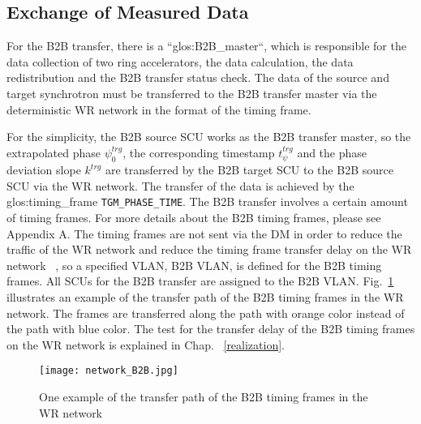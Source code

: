 \subsection{Exchange of Measured Data}

For the B2B transfer, there is a ``\gls{glos:B2B_master}``, which is responsible for the data collection of two ring accelerators, the data calculation, the data redistribution and the B2B transfer status check. The data of the source and target synchrotron must be transferred to the B2B transfer master via the deterministic WR network in the format of the timing frame.
 
For the simplicity, the B2B source SCU works as the B2B transfer master, so the extrapolated phase $\psi^\mathit{trg}_0$, the corresponding timestamp $t_\psi^\mathit{trg}$ and the phase deviation slope $k^\mathit{trg}$ are transferred by the B2B target SCU to the B2B source SCU via the WR network. The transfer of the data is achieved by the \gls{glos:timing_frame} \verb|TGM_PHASE_TIME|. The B2B transfer involves a certain amount of timing frames. For more details about the B2B timing frames, please see Appendix A. The timing frames are not sent via the DM in order to reduce the traffic of the WR network and reduce the timing frame transfer delay on the WR network ~\cite{bai_concept_2016}, so a specified VLAN, B2B \gls{VLAN}, is defined for the B2B timing frames. All SCUs for the B2B transfer are assigned to the B2B VLAN. Fig.~\ref{network_B2B} illustrates an example of the transfer path of the B2B timing frames in the WR network. The frames are transferred along the path with orange color instead of the path with blue color. The test for the transfer delay of the B2B timing frames on the WR network is explained in Chap. ~\ref{realization}.
 \begin{figure}[!htb]
   \centering   
   \texttt{[image: network\_B2B.jpg]}
   \caption{One example of the transfer path of the B2B timing frames in the WR network}
   \label{network_B2B}
\end{figure}
